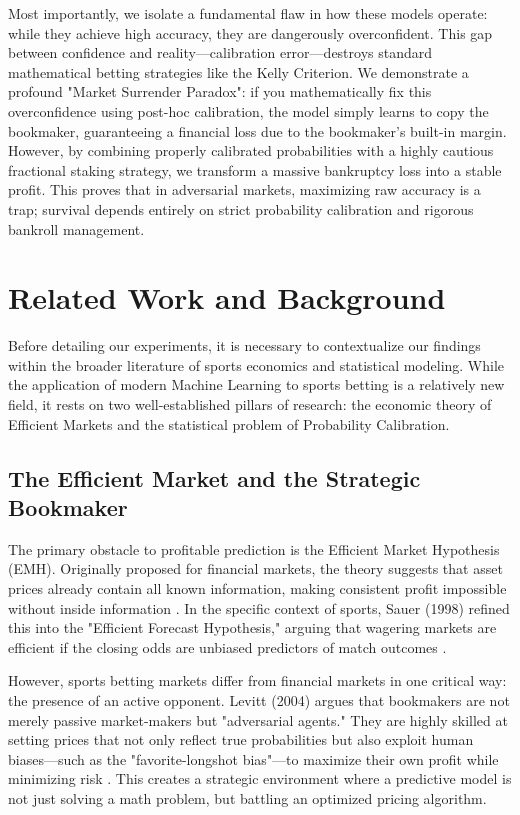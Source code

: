 \documentclass[pdflatex,sn-basic]{sn-jnl}
\begin{document}
Most importantly, we isolate a fundamental flaw in how these models operate: while they achieve high accuracy, they are dangerously overconfident. This gap between confidence and reality—calibration error—destroys standard mathematical betting strategies like the Kelly Criterion. We demonstrate a profound "Market Surrender Paradox": if you mathematically fix this overconfidence using post-hoc calibration, the model simply learns to copy the bookmaker, guaranteeing a financial loss due to the bookmaker's built-in margin. However, by combining properly calibrated probabilities with a highly cautious fractional staking strategy, we transform a massive bankruptcy loss into a stable profit. This proves that in adversarial markets, maximizing raw accuracy is a trap; survival depends entirely on strict probability calibration and rigorous bankroll management.

\section{Related Work and Background}

Before detailing our experiments, it is necessary to contextualize our findings within the broader literature of sports economics and statistical modeling. While the application of modern Machine Learning to sports betting is a relatively new field, it rests on two well-established pillars of research: the economic theory of Efficient Markets and the statistical problem of Probability Calibration.

\subsection{The Efficient Market and the Strategic Bookmaker}
The primary obstacle to profitable prediction is the Efficient Market Hypothesis (EMH). Originally proposed for financial markets, the theory suggests that asset prices already contain all known information, making consistent profit impossible without inside information \cite{fama1970}. In the specific context of sports, Sauer (1998) refined this into the "Efficient Forecast Hypothesis," arguing that wagering markets are efficient if the closing odds are unbiased predictors of match outcomes \cite{sauer1998}.

However, sports betting markets differ from financial markets in one critical way: the presence of an active opponent. Levitt (2004) argues that bookmakers are not merely passive market-makers but "adversarial agents." They are highly skilled at setting prices that not only reflect true probabilities but also exploit human biases—such as the "favorite-longshot bias"—to maximize their own profit while minimizing risk \cite{levitt2004, griffith1949}. This creates a strategic environment where a predictive model is not just solving a math problem, but battling an optimized pricing algorithm.
\end{document}
